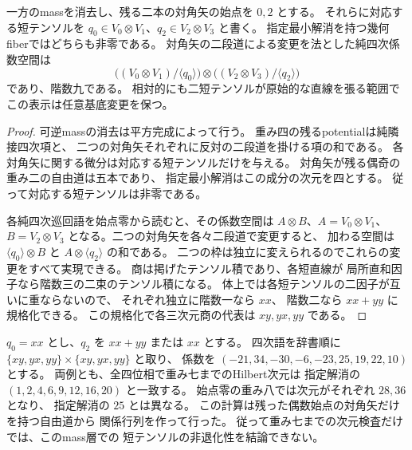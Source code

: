 \begin{proposition}[一mass消去後の四次係数空間]
\label{prop:qa-avatar-one-mass-quartic-space}
一方のmassを消去し、残る二本の対角矢の始点を $0,2$ とする。
それらに対応する短テンソルを
$q_0\in V_0\otimes V_1$、$q_2\in V_2\otimes V_3$ と書く。
指定最小解消を持つ幾何fiberではどちらも非零である。
対角矢の二段道による変更を法とした純四次係数空間は
\[
 \bigl((V_0\otimes V_1)/\langle q_0\rangle\bigr)
 \otimes
 \bigl((V_2\otimes V_3)/\langle q_2\rangle\bigr)
\]
であり、階数九である。
相対的にも二短テンソルが原始的な直線を張る範囲で
この表示は任意基底変更を保つ。
\end{proposition}
\begin{proof}
可逆massの消去は平方完成によって行う。
重み四の残るpotentialは純隣接四次項と、
二つの対角矢それぞれに反対の二段道を掛ける項の和である。
各対角矢に関する微分は対応する短テンソルだけを与える。
対角矢が残る偶奇の重み二の自由道は五本であり、
指定最小解消はこの成分の次元を四とする。
従って対応する短テンソルは非零である。

各純四次巡回語を始点零から読むと、その係数空間は
$A\otimes B$、$A=V_0\otimes V_1$、$B=V_2\otimes V_3$
となる。二つの対角矢を各々二段道で変更すると、
加わる空間は $\langle q_0\rangle\otimes B$ と
$A\otimes\langle q_2\rangle$ の和である。
二つの枠は独立に変えられるのでこれらの変更をすべて実現できる。
商は掲げたテンソル積であり、各短直線が
局所直和因子なら階数三の二束のテンソル積になる。
体上では各短テンソルの二因子が互いに重ならないので、
それぞれ独立に階数一なら $xx$、
階数二なら $xx+yy$ に規格化できる。
この規格化で各三次元商の代表は $xy,yx,yy$ である。
\end{proof}

\begin{example}[一massの低重み検査の限界]
$q_0=xx$ とし、$q_2$ を $xx+yy$ または $xx$ とする。
四次語を辞書順に $\{xy,yx,yy\}\times\{xy,yx,yy\}$ と取り、
係数を $(-21,34,-30,-6,-23,25,19,22,10)$ とする。
両例とも、全四位相で重み七までのHilbert次元は
指定解消の $(1,2,4,6,9,12,16,20)$ と一致する。
始点零の重み八では次元がそれぞれ $28,36$ となり、
指定解消の $25$ とは異なる。
この計算は残った偶数始点の対角矢だけを持つ自由道から
関係行列を作って行った。
従って重み七までの次元検査だけでは、このmass層での
短テンソルの非退化性を結論できない。
\end{example}

